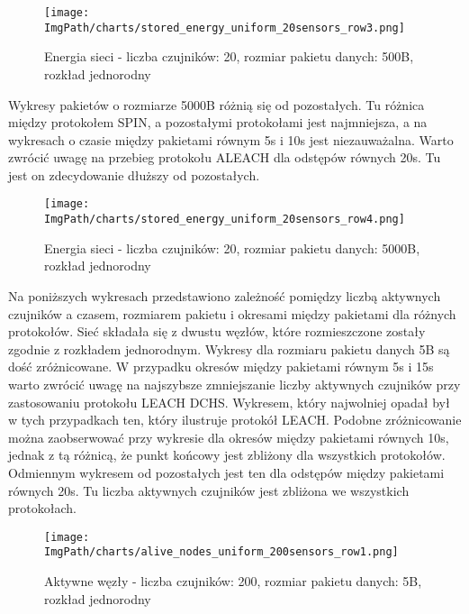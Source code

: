 \begin{figure}[H]
	\begin{center}
		\texttt{[image: \\ImgPath/charts/stored\_energy\_uniform\_20sensors\_row3.png]}
	\end{center}
	\caption{Energia sieci - liczba czujników: 20, rozmiar pakietu danych: 500B, rozkład jednorodny}
\end{figure}
 
Wykresy pakietów o rozmiarze 5000B różnią się od pozostałych. Tu różnica między protokołem SPIN, a pozostałymi protokołami jest najmniejsza, a na wykresach o czasie między pakietami równym 5s i 10s jest niezauważalna. Warto zwrócić uwagę na przebieg protokołu ALEACH dla odstępów równych 20s. Tu jest on zdecydowanie dłuższy od pozostałych. 

\begin{figure}[H]
	\begin{center}
		\texttt{[image: \\ImgPath/charts/stored\_energy\_uniform\_20sensors\_row4.png]}
	\end{center}
	\caption{Energia sieci - liczba czujników: 20, rozmiar pakietu danych: 5000B, rozkład jednorodny}
\end{figure}

Na poniższych wykresach przedstawiono zależność pomiędzy liczbą aktywnych czujników a czasem, rozmiarem pakietu i okresami między pakietami dla różnych protokołów. Sieć składała się z dwustu węzłów, które rozmieszczone zostały zgodnie z rozkładem jednorodnym.
Wykresy dla rozmiaru pakietu danych 5B są dość zróżnicowane. W przypadku okresów między pakietami równym 5s i 15s warto zwrócić uwagę na najszybsze zmniejszanie liczby aktywnych czujników przy zastosowaniu protokołu LEACH DCHS. Wykresem, który najwolniej opadał był w tych przypadkach ten, który ilustruje protokół LEACH. Podobne zróżnicowanie można zaobserwować przy wykresie dla okresów między pakietami równych 10s, jednak z tą różnicą, że punkt końcowy jest zbliżony dla wszystkich protokołów. Odmiennym wykresem od pozostałych jest ten dla odstępów między pakietami równych 20s. Tu liczba aktywnych czujników jest zbliżona we wszystkich protokołach.

\begin{figure}[H]
	\begin{center}
		\texttt{[image: \\ImgPath/charts/alive\_nodes\_uniform\_200sensors\_row1.png]}
	\end{center}
	\caption{Aktywne węzły - liczba czujników: 200, rozmiar pakietu danych: 5B, rozkład jednorodny}
\end{figure}

